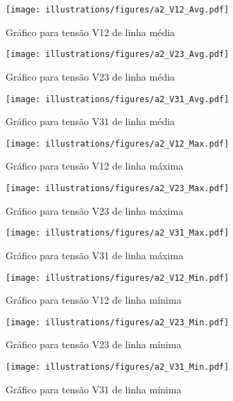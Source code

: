 \begin{figure}[H]
	\centering
	\caption{Gráfico para tensão V12 de linha média}
    \texttt{[image: illustrations/figures/a2\_V12\_Avg.pdf]}
\end{figure}

\begin{figure}[H]
	\centering
	\caption{Gráfico para tensão V23 de linha média}
    \texttt{[image: illustrations/figures/a2\_V23\_Avg.pdf]}
\end{figure}

\begin{figure}[H]
	\centering
	\caption{Gráfico para tensão V31 de linha média}
    \texttt{[image: illustrations/figures/a2\_V31\_Avg.pdf]}
\end{figure}

\begin{figure}[H]
	\centering
	\caption{Gráfico para tensão V12 de linha máxima}
    \texttt{[image: illustrations/figures/a2\_V12\_Max.pdf]}
\end{figure}

\begin{figure}[H]
	\centering
	\caption{Gráfico para tensão V23 de linha máxima}
    \texttt{[image: illustrations/figures/a2\_V23\_Max.pdf]}
\end{figure}

\begin{figure}[H]
	\centering
	\caption{Gráfico para tensão V31 de linha máxima}
    \texttt{[image: illustrations/figures/a2\_V31\_Max.pdf]}
\end{figure}

\begin{figure}[H]
	\centering
	\caption{Gráfico para tensão V12 de linha mínima}
    \texttt{[image: illustrations/figures/a2\_V12\_Min.pdf]}
\end{figure}

\begin{figure}[H]
	\centering
	\caption{Gráfico para tensão V23 de linha mínima}
    \texttt{[image: illustrations/figures/a2\_V23\_Min.pdf]}
\end{figure}

\begin{figure}[H]
	\centering
	\caption{Gráfico para tensão V31 de linha mínima}
    \texttt{[image: illustrations/figures/a2\_V31\_Min.pdf]}
\end{figure}


